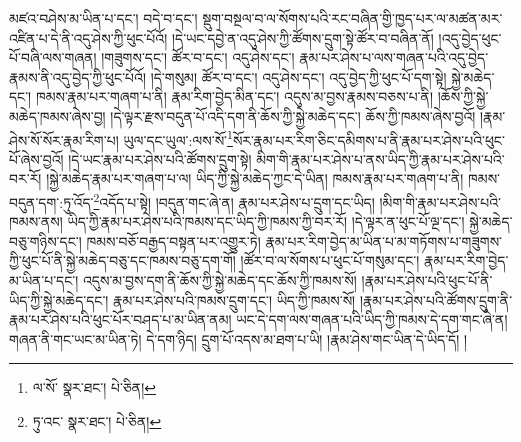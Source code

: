 མཛའ་བཤེས་མ་ཡིན་པ་དང་། བདེ་བ་དང་། སྡུག་བསྔལ་བ་ལ་སོགས་པའི་རང་བཞིན་གྱི་ཁྱད་པར་ལ་མཚན་མར་འཛིན་པ་དེ་ནི་འདུ་ཤེས་ཀྱི་ཕུང་པོའོ། །དེ་ཡང་དབྱེ་ན་འདུ་ཤེས་ཀྱི་ཚོགས་དྲུག་སྟེ་ཚོར་བ་བཞིན་ནོ། །འདུ་བྱེད་ཕུང་པོ་བཞི་ལས་གཞན། །གཟུགས་དང་། ཚོར་བ་དང་། འདུ་ཤེས་དང་། རྣམ་པར་ཤེས་པ་ལས་གཞན་པའི་འདུ་བྱེད་རྣམས་ནི་འདུ་བྱེད་ཀྱི་ཕུང་པོའོ། །དེ་གསུམ། ཚོར་བ་དང་། འདུ་ཤེས་དང་། འདུ་བྱེད་ཀྱི་ཕུང་པོ་དག་སྟེ། སྐྱེ་མཆེད་དང་། ཁམས་རྣམ་པར་གཞག་པ་ནི། རྣམ་རིག་བྱེད་མིན་དང་། འདུས་མ་བྱས་རྣམས་བཅས་པ་ནི། །ཆོས་ཀྱི་སྐྱེ་མཆེད་ཁམས་ཞེས་བྱ། །དེ་ལྟར་རྫས་བདུན་པོ་འདི་དག་ནི་ཆོས་ཀྱི་སྐྱེ་མཆེད་དང་། ཆོས་ཀྱི་ཁམས་ཞེས་བྱའོ། །རྣམ་ཤེས་སོ་སོར་རྣམ་རིག་པ། ཡུལ་དང་ཡུལ་:ལས་སོ་\footnote{ལ་སོ་  སྣར་ཐང་།  པེ་ཅིན། }སོར་རྣམ་པར་རིག་ཅིང་དམིགས་པ་ནི་རྣམ་པར་ཤེས་པའི་ཕུང་པོ་ཞེས་བྱའོ། །དེ་ཡང་རྣམ་པར་ཤེས་པའི་ཚོགས་དྲུག་སྟེ། མིག་གི་རྣམ་པར་ཤེས་པ་ནས་ཡིད་ཀྱི་རྣམ་པར་ཤེས་པའི་བར་རོ། །སྐྱེ་མཆེད་རྣམ་པར་གཞག་པ་ལ། ཡིད་ཀྱི་སྐྱེ་མཆེད་ཀྱང་དེ་ཡིན། ཁམས་རྣམ་པར་གཞག་པ་ནི། ཁམས་བདུན་དག་:ཏུ་འོད་\footnote{ཏུ་འང་  སྣར་ཐང་།  པེ་ཅིན། }འདོད་པ་སྟེ། །བདུན་གང་ཞེ་ན། རྣམ་པར་ཤེས་པ་དྲུག་དང་ཡིད། །མིག་གི་རྣམ་པར་ཤེས་པའི་ཁམས་ནས། ཡིད་ཀྱི་རྣམ་པར་ཤེས་པའི་ཁམས་དང་ཡིད་ཀྱི་ཁམས་ཀྱི་བར་རོ། །དེ་ལྟར་ན་ཕུང་པོ་ལྔ་དང་། སྐྱེ་མཆེད་བཅུ་གཉིས་དང་། ཁམས་བཅོ་བརྒྱད་བསྟན་པར་འགྱུར་ཏེ། རྣམ་པར་རིག་བྱེད་མ་ཡིན་པ་མ་གཏོགས་པ་གཟུགས་ཀྱི་ཕུང་པོ་ནི་སྐྱེ་མཆེད་བཅུ་དང་ཁམས་བཅུ་དག་གོ། །ཚོར་བ་ལ་སོགས་པ་ཕུང་པོ་གསུམ་དང་། རྣམ་པར་རིག་བྱེད་མ་ཡིན་པ་དང་། འདུས་མ་བྱས་དག་ནི་ཆོས་ཀྱི་སྐྱེ་མཆེད་དང་ཆོས་ཀྱི་ཁམས་སོ། །རྣམ་པར་ཤེས་པའི་ཕུང་པོ་ནི་ཡིད་ཀྱི་སྐྱེ་མཆེད་དང་། རྣམ་པར་ཤེས་པའི་ཁམས་དྲུག་དང་། ཡིད་ཀྱི་ཁམས་སོ། །རྣམ་པར་ཤེས་པའི་ཚོགས་དྲུག་ནི་རྣམ་པར་ཤེས་པའི་ཕུང་པོར་བཤད་པ་མ་ཡིན་ནམ། ཡང་དེ་དག་ལས་གཞན་པའི་ཡིད་ཀྱི་ཁམས་དེ་དག་གང་ཞེ་ན། གཞན་ནི་གང་ཡང་མ་ཡིན་ཏེ། དེ་དག་ཉིད། དྲུག་པོ་འདས་མ་ཐག་པ་ཡི། །རྣམ་ཤེས་གང་ཡིན་དེ་ཡིད་དོ། །
